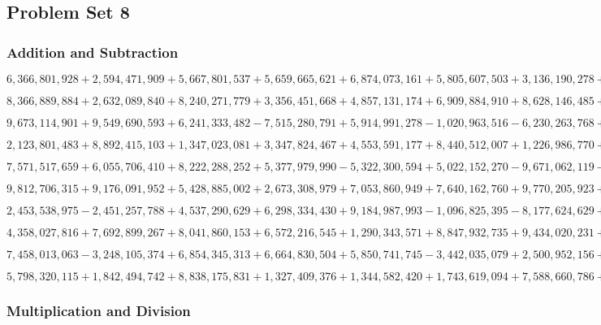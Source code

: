 \hypertarget{problem-set-8-6}{%
\subsection{Problem Set 8}\label{problem-set-8-6}}

\hypertarget{addition-and-subtraction-388}{%
\subsubsection{Addition and
Subtraction}\label{addition-and-subtraction-388}}

\(6,366,801,928+2,594,471,909+5,667,801,537+5,659,665,621+6,874,073,161+5,805,607,503+3,136,190,278+8,401,198,699+5,099,731,791+8,255,002,954\)

\(8,366,889,884+2,632,089,840+8,240,271,779+3,356,451,668+4,857,131,174+6,909,884,910+8,628,146,485+9,152,567,243+3,446,020,436+8,642,419,221\)

\(9,673,114,901+9,549,690,593+6,241,333,482-7,515,280,791+5,914,991,278-1,020,963,516-6,230,263,768+6,843,025,972-1,875,545,577+9,519,988,562\)

\(2,123,801,483+8,892,415,103+1,347,023,081+3,347,824,467+4,553,591,177+8,440,512,007+1,226,986,770+2,391,221,398+1,864,139,071+9,154,087,397\)

\(7,571,517,659+6,055,706,410+8,222,288,252+5,377,979,990-5,322,300,594+5,022,152,270-9,671,062,119-7,757,383,929+6,388,182,462-2,202,883,161\)

\(9,812,706,315+9,176,091,952+5,428,885,002+2,673,308,979+7,053,860,949+7,640,162,760+9,770,205,923+8,784,091,801+3,136,810,032+4,367,903,883\)

\(2,453,538,975-2,451,257,788+4,537,290,629+6,298,334,430+9,184,987,993-1,096,825,395-8,177,624,629+2,949,787,065-5,404,058,460+4,195,934,579\)

\(4,358,027,816+7,692,899,267+8,041,860,153+6,572,216,545+1,290,343,571+8,847,932,735+9,434,020,231+2,212,331,466+4,543,664,725+5,901,082,231\)

\(7,458,013,063-3,248,105,374+6,854,345,313+6,664,830,504+5,850,741,745-3,442,035,079+2,500,952,156+3,698,481,813-6,407,151,423-5,311,992,721\)

\(5,798,320,115+1,842,494,742+8,838,175,831+1,327,409,376+1,344,582,420+1,743,619,094+7,588,660,786+9,109,496,994+3,616,858,231+5,781,338,742\)

\hypertarget{multiplication-and-division-386}{%
\subsubsection{Multiplication and
Division}\label{multiplication-and-division-386}}

